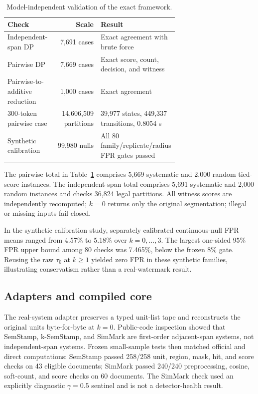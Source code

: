 \documentclass[10pt]{article}
\begin{document}
\begin{table}[t]
\caption{Model-independent validation of the exact framework.}
\label{tab:algorithm}
\centering
\small
\begin{tabular}{p{0.25\linewidth}rp{0.43\linewidth}}
\toprule
Check & Scale & Result \\
\midrule
Independent-span DP & 7,691 cases & Exact agreement with brute force \\
Pairwise DP & 7,669 cases & Exact score, count, decision, and witness \\
Pairwise-to-additive reduction & 1,000 cases & Exact agreement \\
300-token pairwise case & 14,606,509 partitions &
39,977 states, 449,337 transitions, 0.8054 s \\
Synthetic calibration & 99,980 nulls &
All 80 family/replicate/radius FPR gates passed \\
\bottomrule
\end{tabular}
\end{table}

The pairwise total in Table~\ref{tab:algorithm} comprises 5,669 systematic
and 2,000 random tied-score instances. The independent-span total comprises
5,691 systematic and 2,000 random instances and checks 36,824 legal
partitions. All witness scores are independently recomputed; $k=0$ returns
only the original segmentation; illegal or missing inputs fail closed.

In the synthetic calibration study, separately calibrated continuous-null
FPR means ranged from 4.57\% to 5.18\% over $k=0,\ldots,3$. The largest
one-sided 95\% FPR upper bound among 80 checks was 7.465\%, below the frozen
8\% gate. Reusing the raw $\tau_0$ at $k\geq1$ yielded zero FPR in these
synthetic families, illustrating conservatism rather than a real-watermark
result.

\subsection{Adapters and compiled core}

The real-system adapter preserves a typed unit-list tape and reconstructs the
original units byte-for-byte at $k=0$. Public-code inspection showed that
SemStamp, k-SemStamp, and SimMark are first-order adjacent-span systems, not
independent-span systems. Frozen small-sample tests then matched official and
direct computations: SemStamp passed 258/258 unit, region, mask, hit, and
score checks on 43 eligible documents; SimMark passed 240/240 preprocessing,
cosine, soft-count, and score checks on 60 documents. The SimMark check used
an explicitly diagnostic $\gamma=0.5$ sentinel and is not a detector-health
result.
\end{document}
